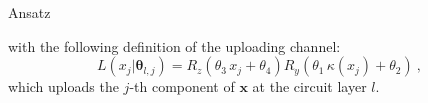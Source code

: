 \documentclass[20pt, final]{beamer}
\newlength{\colwidth}
\begin{document}
\begin{frame}[t]
\begin{columns}[t]
\begin{column}{\colwidth}
\begin{alertblock}{Ansatz}
\begin{figure} 
\label{fig:qpdf}
\end{figure}

with the following definition of the uploading channel:
\begin{equation}
L(x_j| \bm{\theta}_{l,j}) = R_z(\theta_3\,x_j + \theta_4) R_y(\theta_1\, \kappa(x_j) + \theta_2) \ ,
\label{eq:uploading_layer}
\end{equation}
which uploads the $j$-th component of $\bm{x}$ at the circuit layer $l$.
\end{alertblock}


\end{column}
\end{columns}
\end{frame}
\end{document}
